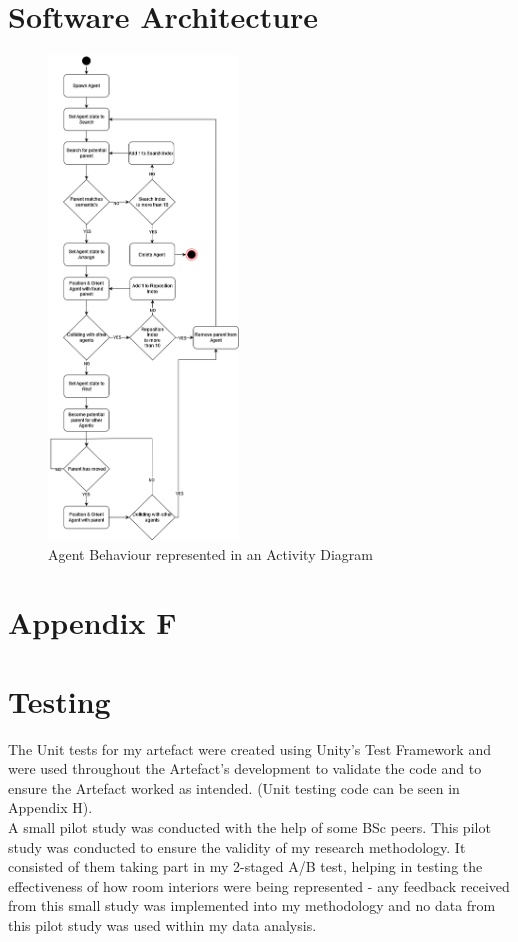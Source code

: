 \section*{Software Architecture}
\label{append:e}
\begin{figure}[ht]
    \includegraphics[width=0.45\textwidth]{./Images/AgentActivityDiagram.png}
    \centering
    \caption{Agent Behaviour represented in an Activity Diagram}
    \label{activity-diagram}
\end{figure}

\newpage
\section*{Appendix F}
\section*{Testing}
\label{append:f}
The Unit tests for my artefact were created using Unity's Test Framework and were used throughout the Artefact's development to validate the code and to ensure the Artefact worked as intended. (Unit testing code can be seen in Appendix H).
\\
A small pilot study was conducted with the help of some BSc peers. This pilot study was conducted to ensure the validity of my research methodology. It consisted of them taking part in my 2-staged A/B test, helping in testing the effectiveness of how room interiors were being represented - any feedback received from this small study was implemented into my methodology and no data from this pilot study was used within my data analysis.

